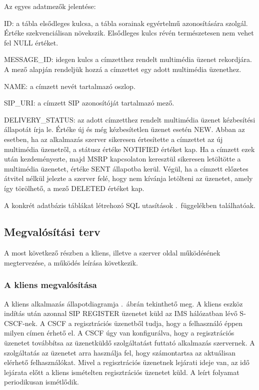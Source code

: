 Az egyes adatmezők jelentése:
\begin{mydescription}
\item[ID:] a tábla elsődleges kulcsa, a tábla sorainak egyértelmű azonosítására szolgál. Értéke szekvenciálisan növekszik. Elsődleges kulcs révén természetesen nem vehet fel NULL értéket.
\item[MESSAGE\_ID:] idegen kulcs a címzetthez rendelt multimédia üzenet rekordjára. A mező alapján rendeljük hozzá a címzettet egy adott multimédia üzenethez.
\item[NAME:]  a címzett nevét tartalmazó oszlop.
\item[SIP\_URI:] a címzett SIP azonosítóját tartalmazó mező.
\item[DELIVERY\_STATUS:] az adott címzetthez rendelt multimédia üzenet kézbesítési állapotát írja le. Értéke új és még kézbesítetlen üzenet esetén NEW. Abban az esetben, ha az alkalmazás szerver sikeresen értesítette a címzettet az új multimédia üzenetről, a státusz értéke NOTIFIED értéket kap. Ha a címzett ezek után kezdeményezte, majd MSRP kapcsolaton keresztül sikeresen letöltötte a multimédia üzenetet, értéke SENT állapotba kerül. Végül, ha a címzett előzetes átvitel nélkül jelezte a szerver felé, hogy nem kívánja letölteni az üzenetet, amely így törölhető, a mező DELETED értéket kap.
\end{mydescription}

A konkrét adatbázis táblákat létrehozó SQL utasítások .~függelékben találhatóak.
\medskip

\subsection{Megvalósítási terv}
\label{sec:megvalositas}

A most következő részben a kliens, illetve a szerver oldal működésének megtervezése, a működés leírása következik.

\subsubsection{A kliens megvalósítása}
\label{sec:kliensmegvalositas}

A kliens alkalmazás állapotdiagramja .~ábrán tekinthető meg. A kliens eszköz indítás után azonnal SIP REGISTER üzenetet küld az IMS hálózatban lévő S-CSCF-nek. A CSCF a  regisztrációs üzenetből tudja, hogy a felhasználó éppen milyen címen érhető el. A CSCF úgy van konfigurálva, hogy a regisztrációs üzenetet továbbítsa az üzenetküldő szolgáltatást futtató alkalmazás szervernek. A szolgáltatás az üzenetet arra használja fel, hogy számontartsa az aktuálisan elérhető felhasználókat. Mivel a regisztrációs üzenetnek lejárati ideje van, az idő lejárata előtt a kliens ismételten regisztrációs üzenetet küld. A leírt folyamat periodikusan ismétlődik.

